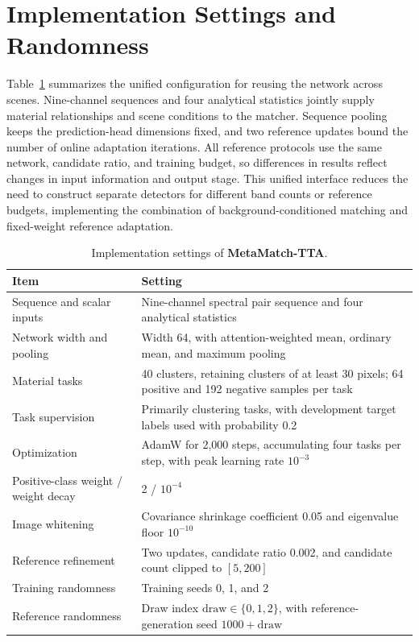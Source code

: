 \documentclass[a4paper,11pt]{article}
\newcommand{\method}{\textbf{MetaMatch-TTA}}
\begin{document}
\section{Implementation Settings and Randomness}\label{supp:implementation}
Table~\ref{tab:config} summarizes the unified configuration for reusing the network across scenes. Nine-channel sequences and four analytical statistics jointly supply material relationships and scene conditions to the matcher. Sequence pooling keeps the prediction-head dimensions fixed, and two reference updates bound the number of online adaptation iterations. All reference protocols use the same network, candidate ratio, and training budget, so differences in results reflect changes in input information and output stage. This unified interface reduces the need to construct separate detectors for different band counts or reference budgets, implementing the combination of background-conditioned matching and fixed-weight reference adaptation.
\begin{table}[htbp]\centering\small\setlength{\tabcolsep}{4pt}
\caption{Implementation settings of \textbf{\method{}}.}\label{tab:config}
\begin{tabularx}{\linewidth}{p{4cm}X}\toprule
Item & Setting \\ \midrule
Sequence and scalar inputs & Nine-channel spectral pair sequence and four analytical statistics \\
Network width and pooling & Width 64, with attention-weighted mean, ordinary mean, and maximum pooling \\
Material tasks & 40 clusters, retaining clusters of at least 30 pixels; 64 positive and 192 negative samples per task \\
Task supervision & Primarily clustering tasks, with development target labels used with probability 0.2 \\
Optimization & AdamW for 2,000 steps, accumulating four tasks per step, with peak learning rate $10^{-3}$ \\
Positive-class weight / weight decay & 2 / $10^{-4}$ \\
Image whitening & Covariance shrinkage coefficient 0.05 and eigenvalue floor $10^{-10}$ \\
Reference refinement & Two updates, candidate ratio 0.002, and candidate count clipped to $[5,200]$ \\
Training randomness & Training seeds 0, 1, and 2 \\
Reference randomness & Draw index $\mathrm{draw}\in\{0,1,2\}$, with reference-generation seed $1000+\mathrm{draw}$ \\
\bottomrule\end{tabularx}
\end{table}
\end{document}
